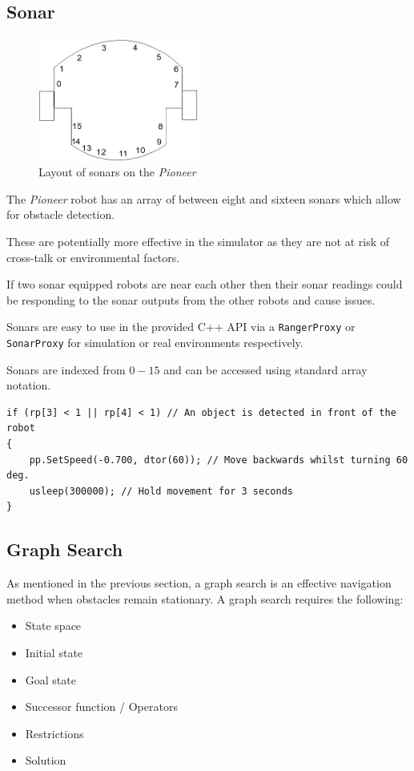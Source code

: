 \documentclass[a4paper,12pt]{article}
\begin{document}
\subsection{Sonar}
\begin{figure}
    \begin{center}
            \includegraphics[width=0.47\textwidth]{images/sonars_wiki_dcs_aber_ac_uk.png}
            \caption{Layout of sonars on the \textit{Pioneer} \cite{sonardiagram}}
    \end{center}
\end{figure}

The \textit{Pioneer} robot has an array of between eight and sixteen sonars which allow for obstacle detection.

These are potentially more effective in the simulator as they are not at risk of cross-talk or environmental factors. 

If two sonar equipped robots are near each other then their sonar readings could be responding to the sonar outputs from the other robots and cause issues.

Sonars are easy to use in the provided C++ API via a \texttt{RangerProxy} or \texttt{SonarProxy} for simulation or real environments respectively. 

Sonars are indexed from $0-15$ and can be accessed using standard array notation.

\begin{lstlisting}
if (rp[3] < 1 || rp[4] < 1) // An object is detected in front of the robot
{
    pp.SetSpeed(-0.700, dtor(60)); // Move backwards whilst turning 60 deg.
    usleep(300000); // Hold movement for 3 seconds
} 
\end{lstlisting}
\subsection{Graph Search}
As mentioned in the previous section, a graph search is an effective navigation method when obstacles remain stationary. A graph search requires the following:
\begin{itemize}
    \item{State space}
    \item{Initial state}
    \item{Goal state}
    \item{Successor function / Operators}
    \item{Restrictions}
    \item{Solution}
\end{itemize}
\end{document}

